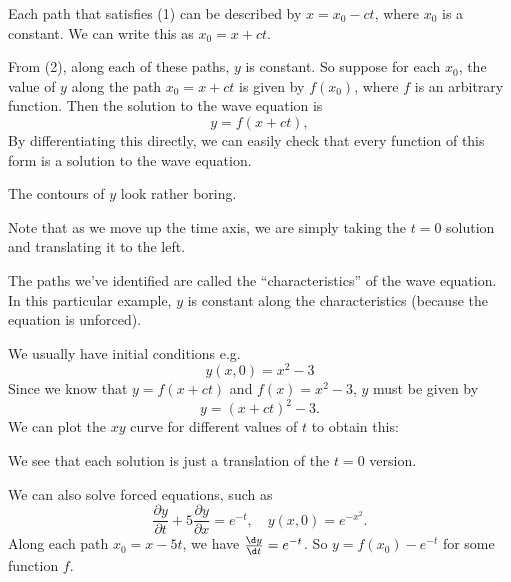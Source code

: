 \documentclass[a4paper]{article}
\begin{document}
Each path that satisfies (1) can be described by $x = x_0 - ct$, where $x_0$ is a constant. We can write this as $x_0 = x + ct$.

From (2), along each of these paths, $y$ is constant. So suppose for each $x_0$, the value of $y$ along the path $x_0 = x + ct$ is given by $f(x_0)$, where $f$ is an arbitrary function. Then the solution to the wave equation is
\[
  y = f(x + ct),
\]
By differentiating this directly, we can easily check that every function of this form is a solution to the wave equation.

The contours of $y$ look rather boring.
\begin{center}
\end{center}
Note that as we move up the time axis, we are simply taking the $t = 0$ solution and translating it to the left.

The paths we've identified are called the ``characteristics'' of the wave equation. In this particular example, $y$ is constant along the characteristics (because the equation is unforced).

We usually have initial conditions e.g.
\[
  y(x, 0) = x^2 - 3
\]
Since we know that $y = f(x + ct)$ and $f(x) = x^2 - 3$, $y$ must be given by
\[
  y = (x + ct)^2 - 3.
\]
We can plot the $xy$ curve for different values of $t$ to obtain this:
\begin{center}
\end{center}
We see that each solution is just a translation of the $t = 0$ version.

We can also solve forced equations, such as
\[
  \frac{\partial y}{\partial t} + 5\frac{\partial y}{\partial x} = e^{-t},\quad y(x, 0) = e^{-x^2}.
\]
Along each path $x_0 = x - 5t$, we have $\frac{\d y}{\d t} = e^{-t}$. So $y = f(x_0) - e^{-t}$ for some function $f$.
\end{document}
